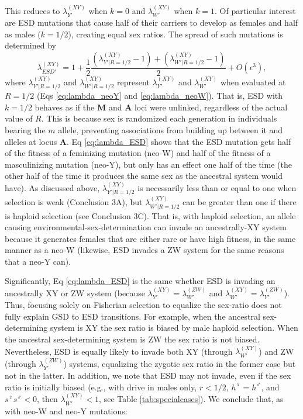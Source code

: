\documentclass[10pt,letterpaper]{article}
\begin{document}
\noindent
This reduces to $\lambda_{Y'}^{(XY)}$ when $k=0$ and $\lambda_{W'}^{(XY)}$ when $k=1$. 
Of particular interest are ESD mutations that cause half of their carriers to develop as females and half as males ($k=1/2$), creating equal sex ratios.
The spread of such mutations is determined by
\begin{equation}
\lambda_{ESD'}^{(XY)} =1+ \frac{1}{2}\frac{(\lambda_{Y'\rvert R=1/2}^{(XY)}-1) + (\lambda_{W'\rvert R=1/2}^{(XY)}-1)}{2} + O\left(\epsilon^3\right),
\label{eq:lambda_ESD}
\end{equation}
\noindent
where $\lambda_{Y'\rvert R=1/2}^{(XY)}$ and $\lambda_{W'\rvert R=1/2}^{(XY)}$ represent $\lambda_{Y'}^{(XY)}$ and $\lambda_{W'}^{(XY)}$ when evaluated at $R=1/2$ (Eqs \ref{eq:lambda_neoY} and \ref{eq:lambda_neoW}).
That is, ESD with $k=1/2$ behaves as if the $\mathbf{M}$ and $\mathbf{A}$ loci were unlinked, regardless of the actual value of $R$.
This is because sex is randomized each generation in individuals bearing the $m$ allele, preventing associations from building up between it and alleles at locus $\mathbf{A}$. 
Eq \eqref{eq:lambda_ESD} shows that the ESD mutation gets half of the fitness of a feminizing mutation (neo-W) and half of the fitness of a masculinizing mutation (neo-Y), but only has an effect one half of the time (the other half of the time it produces the same sex as the ancestral system would have). 
As discussed above, $\lambda_{Y'\rvert R=1/2}^{(XY)}$ is necessarily less than or equal to one when selection is weak (Conclusion 3A), but $\lambda_{W'\rvert R=1/2}^{(XY)}$ can be greater than one if there is haploid selection (see Conclusion 3C).
That is, with haploid selection, an allele causing environmental-sex-determination can invade an ancestrally-XY system because it generates females that are either rare or have high fitness, in the same manner as a neo-W (likewise, ESD invades a ZW system for the same reasons that a neo-Y can).

Significantly, Eq \eqref{eq:lambda_ESD} is the same whether ESD is invading an ancestrally XY or ZW system (because $\lambda_{Y'}^{(XY)} = \lambda_{W'}^{(ZW)}$ and $\lambda_{W'}^{(XY)} = \lambda_{Y'}^{(ZW)}$).
Thus, focusing solely on Fisherian selection to equalize the sex-ratio does not fully explain GSD to ESD transitions.
For example, when the ancestral sex-determining system is XY the sex ratio is biased by male haploid selection.
When the ancestral sex-determining system is ZW the sex ratio is not biased.
Nevertheless, ESD is equally likely to invade both XY (through $\lambda_{W'}^{(XY)}$) and ZW (through $\lambda_{Y'}^{(ZW)}$) systems, equalizing the zygotic sex ratio in the former case but not in the latter. 
In addition, we note that ESD may not invade, even if the sex ratio is initially biased (e.g., with drive in males only, $r<1/2$, $h^\female=h^\male$, and $s^\female s^\male<0$, then $\lambda_{W'}^{(XY)}<1$, see Table \ref{tab:specialcases}). 
We conclude that, as with neo-W and neo-Y mutations:
\vspace{0.5cm}
\end{document}
